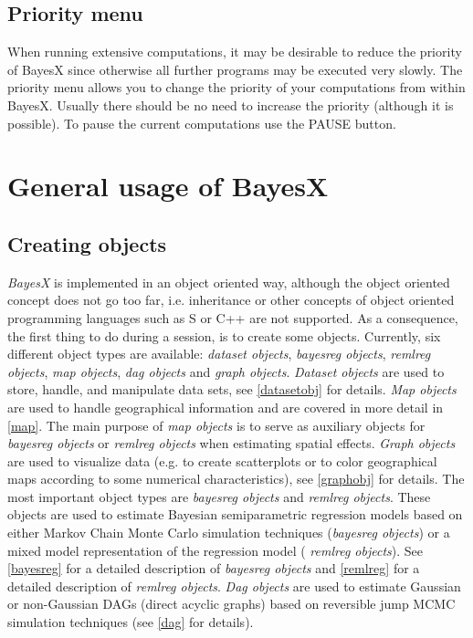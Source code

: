 \subsection{Priority menu}
\label{prioritymenu} 

When running extensive computations, it may be desirable to reduce the priority of BayesX since otherwise all further programs
may be executed very slowly. The priority menu allows you to change the priority of your computations from within BayesX.
Usually there should be no need to increase the priority (although it is possible). To pause the current computations use the
PAUSE button.

\section{General usage of BayesX}
\label{generalusage}

\subsection{Creating objects}
\label{createobject}  

{\em BayesX} is implemented in an object oriented way, although the object oriented concept does not go too far, i.e.
inheritance or other concepts of object oriented programming languages such as S or C++ are not supported. As a consequence,
the first thing to do during a session, is to create some objects. Currently, six different object types are available: {\em
dataset objects}, {\em bayesreg objects}, {\em remlreg objects}, {\em map objects}, {\em dag objects} and {\em graph objects}.
{\em Dataset objects} are used to store, handle, and manipulate data sets, see \autoref{datasetobj} for details. {\em Map
objects} are used to handle geographical information and are covered in more detail in \autoref{map}. The main purpose of {\em
map objects} is to serve as auxiliary objects for {\em bayesreg objects} or {\em remlreg objects} when estimating spatial
effects. {\em Graph objects} are used to visualize data (e.g. to create scatterplots or to color geographical maps according to
some numerical characteristics), see \autoref{graphobj} for details. The most important object types are {\em bayesreg objects}
and {\em remlreg objects}. These objects are used to estimate Bayesian semiparametric regression models based on either Markov
Chain Monte Carlo simulation techniques ({\em bayesreg objects}) or a mixed model representation of the regression model ({\em
remlreg objects}). See \autoref{bayesreg} for a detailed description of {\em bayesreg objects} and \autoref{remlreg} for a
detailed description of {\em remlreg objects}. {\em Dag objects} are used to estimate Gaussian or non-Gaussian DAGs (direct
acyclic graphs) based on reversible jump MCMC simulation techniques (see \autoref{dag} for details).

